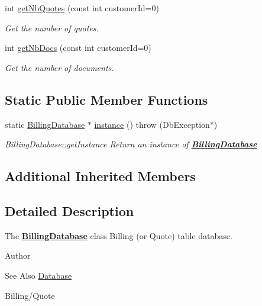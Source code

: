 \begin{DoxyCompactItemize}
int \hyperlink{classDatabases_1_1BillingDatabase_a68ba76c50066be61efbe71e0be24677c}{get\-Nb\-Quotes} (const int customer\-Id=0)
\begin{DoxyCompactList}\small\item\em Get the number of quotes. \end{DoxyCompactList}\item 
int \hyperlink{classDatabases_1_1BillingDatabase_a61b223cf1f0bef5421e6c39fd4bbe827}{get\-Nb\-Docs} (const int customer\-Id=0)
\begin{DoxyCompactList}\small\item\em Get the number of documents. \end{DoxyCompactList}\end{DoxyCompactItemize}
\subsection*{Static Public Member Functions}
\begin{DoxyCompactItemize}
\item 
static \hyperlink{classDatabases_1_1BillingDatabase}{Billing\-Database} $\ast$ \hyperlink{classDatabases_1_1BillingDatabase_aee84d7d07ff4a25251c61030019e5abb}{instance} ()  throw (\-Db\-Exception$\ast$)
\begin{DoxyCompactList}\small\item\em Billing\-Database\-::get\-Instance Return an instance of {\bfseries \hyperlink{classDatabases_1_1BillingDatabase}{Billing\-Database}} \end{DoxyCompactList}\end{DoxyCompactItemize}
\subsection*{Additional Inherited Members}


\subsection{Detailed Description}
The {\bfseries \hyperlink{classDatabases_1_1BillingDatabase}{Billing\-Database}} class Billing (or Quote) table database. 

\begin{DoxyAuthor}{Author}

\end{DoxyAuthor}
\begin{DoxySeeAlso}{See Also}
\hyperlink{classDatabases_1_1Database}{Database} 

Billing/\-Quote 
\end{DoxySeeAlso}


